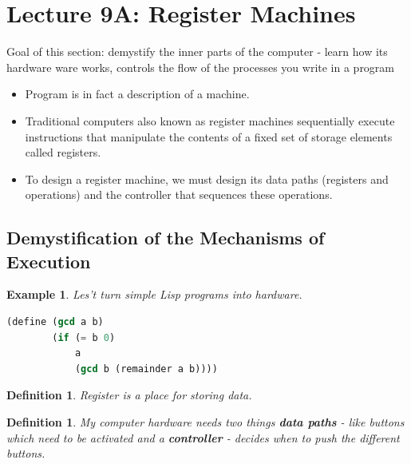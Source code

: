 \documentclass[a4paper,twoside]{article}
\newtheorem{example}[theorem]{Example}
\newtheorem{definition}[theorem]{Definition}
\numberwithin{equation}{section}
\begin{document}
\section{Lecture 9A: Register Machines}
Goal of this section: demystify the inner parts of the computer - learn how its hardware ware works,
controls the flow of the processes you write in a program
\begin{itemize}
    \item Program is in fact a description of a machine.
    \item Traditional computers also known as register machines sequentially execute instructions
    that manipulate the contents of a fixed set of storage elements called registers.
    \item To design a register machine, we must design its data paths (registers and operations) and
    the controller that sequences these operations.
\end{itemize}

\subsection{Demystification of the Mechanisms of Execution}
\begin{example}
    Les't turn simple Lisp programs into hardware.
\end{example}

\begin{lstlisting}[language=Lisp]
    (define (gcd a b)
        (if (= b 0)
            a
            (gcd b (remainder a b))))
\end{lstlisting}

\begin{definition}
    Register is a place for storing data.
\end{definition}

\begin{definition}
    My computer hardware needs two things \textbf{data paths} - like buttons which need to be
    activated and a \textbf{controller} - decides when to push the different buttons.
\end{definition}
\end{document}
